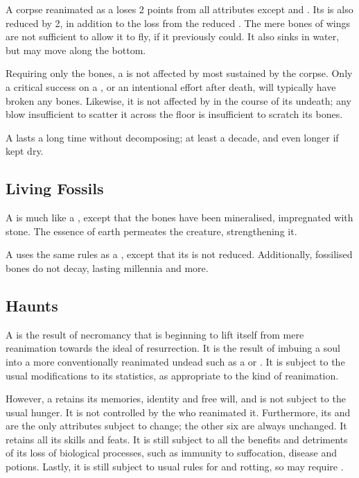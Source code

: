 A corpse reanimated as a  loses 2 points from all attributes except  and .
Its  is also reduced by 2, in addition to the loss from the reduced .
The mere bones of wings are not sufficient to allow it to fly, if it previously could.
It also sinks in water, but may move along the bottom.

Requiring only the bones, a  is not affected by most {\damage} sustained by the corpse.
Only a critical success on a {\damagetest}, or an intentional effort after death, will typically have broken any bones.
Likewise, it is not affected by {\damage} in the course of its undeath; any blow insufficient to scatter it across the floor is insufficient to scratch its bones.

A  lasts a long time without decomposing; at least a decade, and even longer if kept dry.

\subsection{Living Fossils}

A  is much like a , except that the bones have been mineralised, impregnated with stone.
The essence of earth permeates the creature, strengthening it.

A  uses the same rules as a , except that its  is not reduced.
Additionally, fossilised bones do not decay, lasting millennia and more.

\subsection{Haunts}

A  is the result of necromancy that is beginning to lift itself from mere reanimation towards the ideal of resurrection.
It is the result of imbuing a soul into a more conventionally reanimated undead such as a  or .
It is subject to the usual modifications to its statistics, as appropriate to the kind of reanimation.

However, a  retains its memories, identity and free will, and is not subject to the usual hunger.
It is not controlled by the  who reanimated it.
Furthermore, its  and  are the only attributes subject to change; the other six are always unchanged.
It retains all its skills and feats.
It is still subject to all the benefits and detriments of its loss of biological processes, such as immunity to suffocation, disease and potions.
Lastly, it is still subject to usual rules for {\damage} and rotting, so may require .

